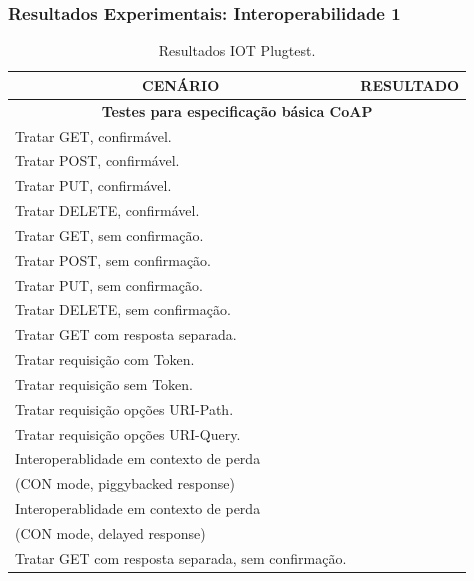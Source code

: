 \documentclass{beamer}
\newcommand{\cmark}{{\color{green}\ding{51}}}%
\begin{document}
\begin{frame}
\frametitle{Resultados Experimentais: Interoperabilidade 1}
\begin{table}[H]
\centering
\scriptsize
\label{plugTest}
\begin{tabular}{p{8cm}|c{1cm}}
\hline
\multicolumn{1}{c|}{\textbf{CEN\'ARIO}} & \multicolumn{1}{c}{\textbf{RESULTADO}} \\ \hline
\multicolumn{2}{c}{\bfseries{Testes para especifica\c{c}\~ao b\'asica CoAP}} \\ \hline
Tratar GET, confirm\'avel. & \cmark \\
Tratar POST, confirm\'avel. & \cmark \\
Tratar PUT, confirm\'avel. & \cmark \\
Tratar DELETE, confirm\'avel. & \cmark \\
Tratar GET, sem confirma\c{c}\~ao. & \cmark \\
Tratar POST, sem confirma\c{c}\~ao. & \cmark \\
Tratar PUT, sem confirma\c{c}\~ao. & \cmark \\
Tratar DELETE, sem confirma\c{c}\~ao. & \cmark \\
Tratar GET com resposta separada. & \cmark \\
Tratar requisi\c{c}\~ao com Token. & \cmark \\
Tratar requisi\c{c}\~ao sem Token. & \cmark \\
Tratar requisi\c{c}\~ao op\c{c}\~oes URI-Path. & \cmark \\
Tratar requisi\c{c}\~ao op\c{c}\~oes URI-Query. & \cmark \\
Interoperablidade em contexto de perda\\(CON mode, piggybacked response) & \cmark \\
Interoperablidade em contexto de perda\\(CON mode, delayed response) & \cmark \\
Tratar GET com resposta separada, sem confirma\c{c}\~ao. & \cmark \\ \hline
\end{tabular}
\caption{Resultados IOT Plugtest.}
\end{table}
\end{frame}
\end{document}
